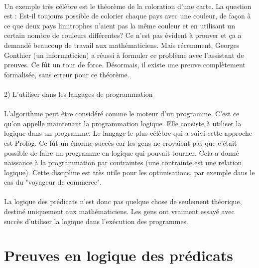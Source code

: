 \subsubsection{}
    
    Un exemple très célèbre est le théorème de la coloration d'une carte. La question est : Est-il toujours possible de colorier chaque pays avec une couleur, de façon à ce que deux pays limitrophes n'aient pas la même couleur et en utilisant un certain nombre de couleurs différentes? Ce n'est pas évident à prouver et ça a demandé beaucoup de travail aux mathématiciens. Mais récemment, Georges Gonthier (un informaticien) a réussi à formuler ce problème avec l'assistant de preuves. Ce fût un tour de force. Désormais, il existe une preuve complètement formalisée, sans erreur pour ce théorème.

\subsubsection{}
2) L'utiliser dans les langages de programmation
\subsubsection{}

    L'algorithme peut être considéré comme le moteur d'un programme. C'est ce qu'on appelle maintenant la programmation logique. Elle consiste à utiliser la logique dans un programme. Le langage le plus célèbre qui a suivi cette approche est Prolog. Ce fût un énorme succès car les gens ne croyaient pas que c'était possible de faire un programme en logique qui pouvait tourner. Cela a donné naissance à la programmation par contraintes (une contrainte est une relation logique). Cette discipline est très utile pour les optimisations, par exemple dans le cas du "voyageur de commerce".

\subsubsection{}
La logique des prédicats n'est donc pas quelque chose de seulement théorique, destiné uniquement aux mathématiciens. Les gens ont vraiment essayé avec succès d'utiliser la logique dans l'exécution des programmes.
\subsubsection{}

\chapter{Preuves en logique des prédicats}

